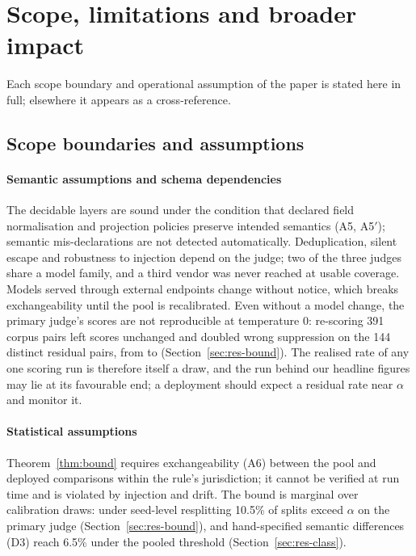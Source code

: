 \section{Scope, limitations and broader impact}\label{sec:limitations}

Each scope boundary and operational assumption of the paper is stated here in full; elsewhere it appears as a cross-reference.

\subsection{Scope boundaries and assumptions}

\paragraph{Semantic assumptions and schema dependencies}
The decidable layers are sound under the condition that declared field normalisation and projection policies preserve intended semantics (A5, A5$'$); semantic mis-declarations are not detected automatically. Deduplication, silent escape and robustness to injection depend on the judge; two of the three judges share a model family, and a third vendor was never reached at usable coverage. Models served through external endpoints change without notice, which breaks exchangeability until the pool is recalibrated. Even without a model change, the primary judge's scores are not reproducible at temperature 0: re-scoring 391 corpus pairs left \mclDriftIdenticalCount{} scores unchanged and doubled wrong suppression on the 144 distinct residual pairs, from \mclMOnePersistedCount{} to \mclMOneFreshCount{} (Section~\ref{sec:res-bound}). The realised rate of any one scoring run is therefore itself a draw, and the run behind our headline figures may lie at its favourable end; a deployment should expect a residual rate near $\alpha$ and monitor it.

\paragraph{Statistical assumptions} Theorem~\ref{thm:bound} requires exchangeability (A6) between the pool and deployed comparisons within the rule's jurisdiction; it cannot be verified at run time and is violated by injection and drift. The bound is marginal over calibration draws: under seed-level resplitting 10.5\% of splits exceed $\alpha$ on the primary judge (Section~\ref{sec:res-bound}), and hand-specified semantic differences (D3) reach 6.5\% under the pooled threshold (Section~\ref{sec:res-class}).

